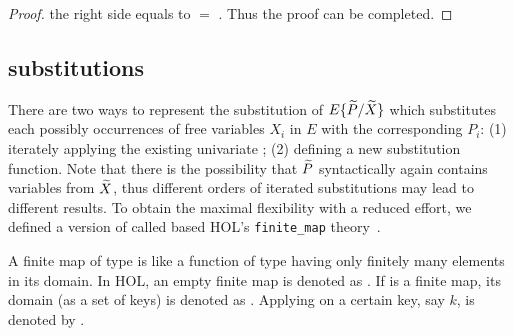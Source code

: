 \begin{proof}
    the right side equals to  $=$
    . Thus
the    proof can 
 be completed.
\end{proof}

\subsection{\Multivariate substitutions}

There are two ways to represent  the \multivariate
substitution of $E\{\widetilde P/\widetilde X\}$ which substitutes each possibly
occurrences of free variables $X_i$ in $E$ with the corresponding
$P_i$: (1) iterately applying the existing univariate
; (2) defining a new \multivariate substitution
function.
Note that  there is the
possibility that $\widetilde P$   syntactically  again contains variables from $\widetilde X$, thus
different orders of iterated substitutions may lead to different results.
To obtain the
maximal flexibility with a reduced effort, we defined
a \multivariate version of 
called  based HOL's \texttt{finite\_map} theory~\cite{holdesc}.

A finite map of type \HOLinline{\ensuremath{\alpha} \HOLTokenMapto{} \ensuremath{\beta}} is like a function of type
\HOLinline{\ensuremath{\alpha} \HOLTokenTransEnd \ensuremath{\beta}} having only finitely many elements in its
domain. In HOL, an empty finite map is denoted as .
If  is a finite map, its domain (as a set of keys) is denoted as
. Applying  on a certain key, say $k$, is denoted
by .

